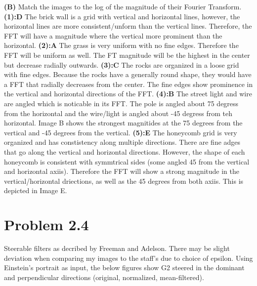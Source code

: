 \documentclass[12pt,twoside]{article}
\newcommand{\tabUnit}{3ex}
\newcommand{\tabT}{\hspace*{\tabUnit}}
\begin{document}
\textbf{(B)} Match the images to the log of the magnitude of their Fourier Transform.
\newline
\newline
\tabT \textbf{(1):D}
\newline
\tabT The brick wall is a grid with vertical and horizontal lines, however, the horizontal lines are more consistent/unform than the vertical lines.  Therefore, the FFT will have a magnitude where the vertical more prominent than the horizontal.
\newline 
\tabT \textbf{(2):A}
\newline
\tabT The grass is very uniform with no fine edges.  Therefore the FFT will be uniform as well.  The FT magnitude will be the highest in the center but decrease radially outwards.
\newline 
\tabT \textbf{(3):C}
\newline
\tabT The rocks are organized in a loose grid with fine edges.  Because the rocks have a generally round shape, they would have a FFT that radially decreases from the center.  The fine edges show prominence in the vertical and horizontal directions of the FFT.
\newline 
\tabT \textbf{(4):B}
\newline
\tabT The street light and wire are angled which is noticable in its FFT.  The pole is angled about 75 degress from the horizontal and the wire/light is angled about -45 degress from teh horizontal.  Image B shows the strongest magnitides at the 75 degrees from the vertical and -45 degrees from the vertical. 
\newline 
\tabT \textbf{(5):E}
\newline
\tabT The honeycomb grid is very organized and has constistency along multiple directions.  There are fine adges that go along the vertical and horizontal directions.  However, the shape of each honeycomb is consistent with symmtrical sides (some angled 45 from the vertical and horizontal axiis).  Therefore the FFT will show a strong magnitude in the vertical/horizontal driections, as well as the 45 degrees from both axiis.  This is depicted in Image E.
\newline

\section*{Problem 2.4}
\tabT Steerable filters as decribed by Freeman and Adelson.  There may be slight deviation when comparing my images to the staff's due to choice of epsilon.  Using Einstein's portrait as input, the below figures show G2 steered in the dominant and perpendicular directions (original, normalized, mean-filtered). 
\newline
\end{document}
